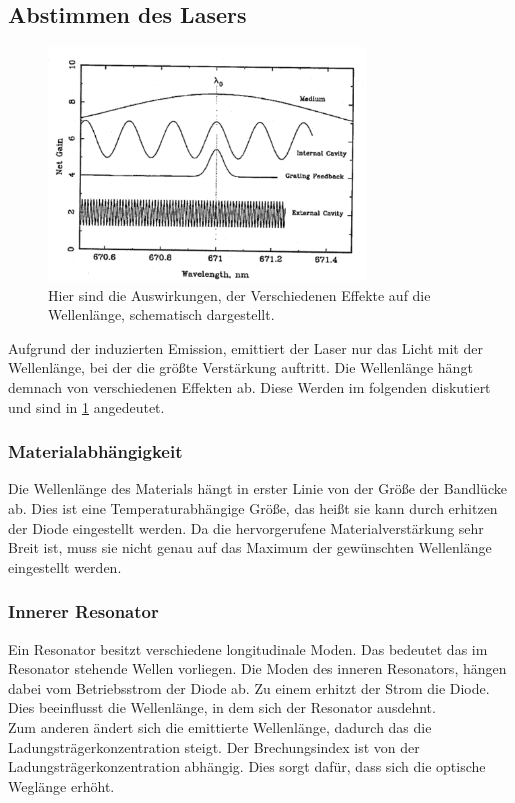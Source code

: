 \subsection{Abstimmen des Lasers}
\begin{figure}[h!]
	\centering
	\includegraphics[width = 0.75\textwidth , angle = 1]{../Grafiken/Photon_Gain_Wellenlaenge_Beitraege.pdf}
	\caption{Hier sind die Auswirkungen, der Verschiedenen Effekte auf die Wellenlänge, schematisch dargestellt.\cite{V60}\label{fig:Photon_Gain_Wellenlaenge_Beitraege}}
\end{figure}
Aufgrund der induzierten Emission, emittiert der Laser nur das Licht mit der Wellenlänge, bei der die größte Verstärkung auftritt.
Die Wellenlänge hängt demnach von verschiedenen Effekten ab.
Diese Werden im folgenden diskutiert und sind in \cref{fig:Photon_Gain_Wellenlaenge_Beitraege} angedeutet.
\subsubsection{Materialabhängigkeit}
Die Wellenlänge des Materials hängt in erster Linie von der Größe der Bandlücke ab.
Dies ist eine Temperaturabhängige Größe, das heißt sie kann durch erhitzen der Diode eingestellt werden.
Da die hervorgerufene Materialverstärkung sehr Breit ist, muss sie nicht genau auf das Maximum der gewünschten Wellenlänge eingestellt werden.
\subsubsection{Innerer Resonator}
Ein Resonator besitzt verschiedene longitudinale Moden.
Das bedeutet das im Resonator stehende Wellen vorliegen.
Die Moden des inneren Resonators, hängen dabei vom Betriebsstrom der Diode ab.
Zu einem erhitzt der Strom die Diode.
Dies beeinflusst die Wellenlänge, in dem sich der Resonator ausdehnt.\\
Zum anderen ändert sich die emittierte Wellenlänge, dadurch das die Ladungsträgerkonzentration steigt.
Der Brechungsindex ist von der Ladungsträgerkonzentration abhängig.
Dies sorgt dafür, dass sich die optische Weglänge erhöht.

